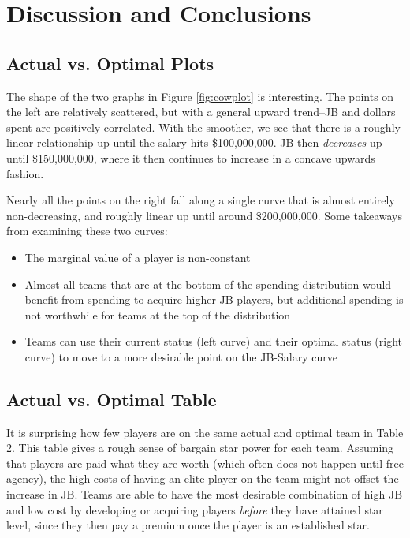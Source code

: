 \documentclass{article}
\begin{document}
\section{Discussion and Conclusions}

\subsection{Actual vs. Optimal Plots}

The shape of the two graphs in Figure \ref{fig:cowplot} is interesting. The points on the left are relatively scattered, but with a general upward trend--JB and dollars spent are positively correlated. With the smoother, we see that there is a roughly linear relationship up until the salary hits \$100,000,000. JB then \emph{decreases} up until \$150,000,000, where it then continues to increase in a concave upwards fashion.

Nearly all the points on the right fall along a single curve that is almost entirely non-decreasing, and roughly linear up until around \$200,000,000. Some takeaways from examining these two curves:
\begin{singlespace}
\begin{itemize}
	\item{The marginal value of a player is non-constant}
	\item{Almost all teams that are at the bottom of the spending distribution would benefit from spending to acquire higher JB players, but additional spending is not worthwhile for teams at the top of the distribution}
	\item{Teams can use their current status (left curve) and their optimal status (right curve) to move to a more desirable point on the JB-Salary curve}
\end{itemize}
\end{singlespace}

\subsection{Actual vs. Optimal Table}

It is surprising how few players are on the same actual and optimal team in Table 2. This table gives a rough sense of bargain star power for each team. Assuming that players are paid what they are worth (which often does not happen until free agency), the high costs of having an elite player on the team might not offset the increase in JB. Teams are able to have the most desirable combination of high JB and low cost by developing or acquiring players \emph{before} they have attained star level, since they then pay a premium once the player is an established star. 
\end{document}
